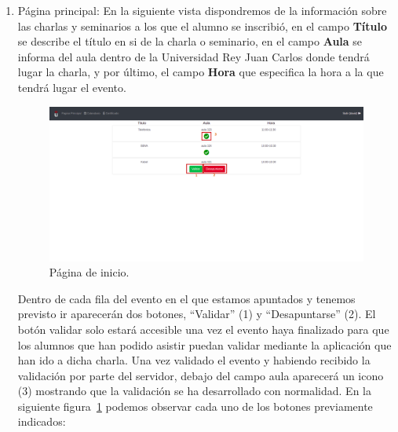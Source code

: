 \documentclass[a4paper, 12pt]{book}
\begin{document}
\begin{enumerate}
  \item Página principal: En la siguiente vista dispondremos de la información sobre las charlas y seminarios a los que el alumno se inscribió, en el campo \textbf{Título} se describe el título en si de la charla o seminario, en el campo \textbf{Aula} se informa del aula dentro de la Universidad Rey Juan Carlos donde tendrá lugar la charla, y por último, el campo \textbf{Hora} que especifica la hora a la que tendrá lugar el evento.
  
    \begin{figure}[h!]
  	\centering
  	\includegraphics[width=13cm, keepaspectratio]{img/inicio.png}
  	\caption{Página de inicio.}\label{fig:inicio}
	\end{figure}
	
  Dentro de cada fila del evento en el que estamos apuntados y tenemos previsto ir aparecerán dos botones, ``Validar'' (1) y ``Desapuntarse'' (2). El botón validar solo estará accesible una vez el evento haya finalizado para que los alumnos que han podido asistir puedan validar mediante la aplicación que han ido a dicha charla. Una vez validado el evento y habiendo recibido la validación por parte del servidor, debajo del campo aula aparecerá un icono (3) mostrando que la validación se ha desarrollado con normalidad. En la siguiente figura~\ref{fig:inicio} podemos observar cada uno de los botones previamente indicados:



\end{enumerate}
\end{document}
